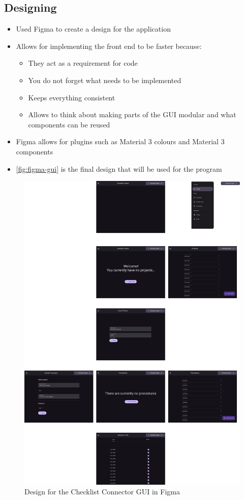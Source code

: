 \documentclass[../dissertation.tex]{subfiles}
\begin{document}
\subsection{Designing}
\begin{itemize}
  \item Used Figma to create a design for the application
  \item Allows for implementing the front end to be faster because:
    \begin{itemize}
      \item They act as a requirement for code
      \item You do not forget what needs to be implemented
      \item Keeps everything consistent
      \item Allows to think about making parts of the GUI modular and what components can be reused
    \end{itemize}
  \item Figma allows for plugins such as Material 3 colours and Material 3 components
  \item \autoref{fig:figma-gui} is the final design that will be used for the
    program
\end{itemize}

\begin{figure}
  \centering
  \includegraphics[width=\columnwidth]{images/figma-gui.pdf}
  \caption[GUI in Figma]{Design for the Checklist Connector GUI in Figma}
  \label{fig:figma-gui}
\end{figure}
\end{document}

